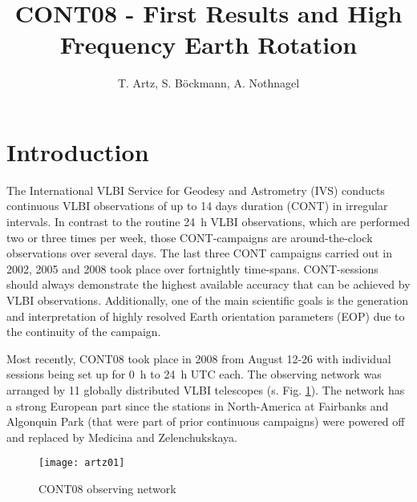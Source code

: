 \documentclass[natbib,twocolumn,twoside]{svmultiag}
\title*{CONT08 - First Results and High Frequency Earth Rotation}
\author{T. Artz, S. B{\"o}ckmann, A. Nothnagel}
\institute{Thomas Artz, Axel Nothnagel and Sarah Tesmer %
           \at Rheinische Friedrich-Wilhelms Universit{\"a}t Bonn, IGG,
               Nu{\ss}allee 17, D-53115 Bonn, Germany
          }
\begin{document}
\maketitle



\section{Introduction}                                \label{sec:introduction}
The International VLBI Service for Geodesy and Astrometry (IVS) conducts 
continuous VLBI observations of up to 14 days duration (CONT) in irregular
intervals. 
In contrast to the routine 24~h VLBI observations, which are performed two or
three times per week, those CONT-campaigns are around-the-clock observations
over several days.
The last three CONT campaigns carried out in 2002, 2005 and 2008 took place
over fortnightly time-spans.
CONT-sessions  should always demonstrate the highest available accuracy that
can be achieved by VLBI observations.
Additionally, one of the main scientific goals is the generation and
interpretation of highly resolved Earth orientation parameters (EOP) due to
the continuity of the campaign.

Most recently, CONT08 took place in 2008 from August 12-26 with individual
sessions being set up for 0~h to 24~h UTC each.
The observing network was arranged by 11 globally distributed VLBI telescopes
(s. Fig. \ref{fig:network}).
The network has a strong European part since the stations in North-America at
Fairbanks and Algonquin Park (that were part of prior continuous campaigns)
were powered off and replaced by Medicina and Zelenchukskaya.
\begin{figure}[tb]
         \texttt{[image: artz01]}
         \caption{CONT08 observing network}
         \label{fig:network}
\end{figure}
\end{document}
